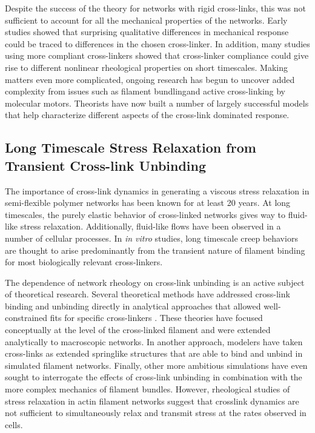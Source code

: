 Despite the success of the theory\cite{theo_best} for networks with rigid cross-links, this was not sufficient to account for all the mechanical properties of the networks. Early studies showed that surprising qualitative differences in mechanical response could be traced to differences in the chosen cross-linker\cite{rheo_crosslinkcompare,rheo_crosslinkreview}.  In addition, many studies using more compliant cross-linkers showed that cross-linker compliance could give rise to different nonlinear rheological properties on short timescales\cite{rheo_crosslink_nonlin1,rheo_crosslink_nonlin2,rheo_crosslink_nonlin3,rheo_crosslink_notactin}. Making matters even more complicated, ongoing research has begun to uncover added complexity from issues such as filament bundling\cite{theo_crosslinkslip2,model_massive}and active cross-linking by molecular motors\cite{rheo_active}. Theorists have now built a number of largely successful models that help characterize different aspects of the cross-link dominated response\cite{theo_nonaffine2,theo_floppy,theo_crosslinknonlinear}.

\subsection{Long Timescale Stress Relaxation from Transient Cross-link Unbinding}

The importance of cross-link dynamics in generating a viscous stress relaxation in semi-flexible polymer networks has been known for at least 20 years\cite{rheo_crosslinksmatter}. At long timescales, the purely elastic behavior of cross-linked networks gives way to fluid-like stress relaxation. Additionally, fluid-like flows have been observed in a number of cellular processes\cite{cellmech_flows,cellmech_flows2,cellmech_flows3,rheo_fluid,rheo_fluid2,cell_rheo_exp}.  In {\em in vitro} studies, long timescale creep behaviors are thought to arise predominantly from the transient nature of filament binding for most biologically relevant cross-linkers\cite{rheo_crosslinkslip1,rheo_crosslinkslip2,rheo_crosslinkslip3,rheo_nonaffine}.  

The dependence of network rheology on cross-link unbinding is an active subject of theoretical research\cite{theo_crosslinkslip2}.  Several theoretical methods have addressed cross-link binding and unbinding directly in analytical approaches that allowed well-constrained fits for specific cross-linkers \cite{theo_crosslinkslip1,theo_crosslinkslip2}.  These theories have focused conceptually at the level of the cross-linked filament and were extended analytically to macroscopic networks.  In another approach, modelers have taken cross-links as extended springlike structures \cite{model_taeyoon} that are able to bind and unbind in simulated filament networks. Finally, other more ambitious simulations have even sought to interrogate the effects of cross-link unbinding in combination with the more complex mechanics of filament bundles\cite{rheo_crosslinkslip2,theo_crosslinkslip3}. However, rheological studies of stress relaxation in actin filament networks suggest that crosslink dynamics are not sufficient to simultaneously relax and transmit stress at the rates observed in cells\cite{De-La-Cruz:2015aa}.

